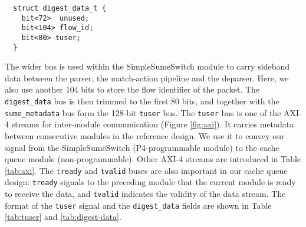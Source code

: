 {\renewcommand{\baselinestretch}{0.8}\small
	\begin{verbatim}
  struct digest_data_t {
    bit<72>  unused;
    bit<104> flow_id;
    bit<80> tuser;
  }
	\end{verbatim}
}

The wider bus is used within the SimpleSumeSwitch module to carry sideband data between the parser, the match-action pipeline and the deparser. Here, we also use another 104 bits to store the flow identifier of the packet. The \verb|digest_data| bus is then trimmed to the first 80 bits, and together with the \verb|sume_metadata| bus form the 128-bit \texttt{tuser} bus. The \texttt{tuser} bus is one of the AXI-4 streams for inter-module communication (Figure \ref{fig:axi}). It carries metadata between consecutive modules in the reference design. We use it to convey our signal from the SimpleSumeSwitch (P4-programmable module) to the cache queue module (non-programmable). Other AXI-4 streams are introduced in Table \ref{tab:axi}. The \verb|tready| and \verb|tvalid| buses are also important in our cache queue design: \verb|tready| signals to the preceding module that the current module is ready to receive the data, and \verb|tvalid| indicates the validity of the data stream. The format of the \texttt{tuser} signal and the \texttt{digest\_data} fields are shown in Table \ref{tab:tuser} and \ref{tab:digest-data}.

